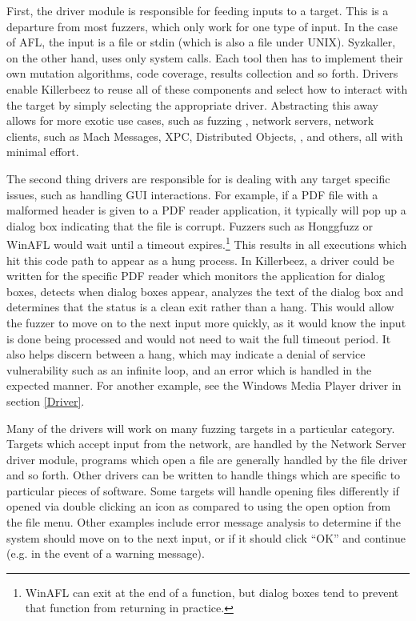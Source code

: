 First, the driver module is responsible for feeding inputs to a target.  This
is a departure from most fuzzers, which only work for one type of input.  In
the case of AFL, the input is a file or stdin (which is also a file under
UNIX).  Syzkaller\cite{syzkaller}, on the other hand, uses only system calls.
Each tool then has to implement their own mutation algorithms, code coverage,
results collection and so forth. Drivers enable Killerbeez to reuse all of
these components and select how to interact with the target by simply selecting
the appropriate driver.  Abstracting this away allows for more exotic use
cases, such as fuzzing \IOCTLs{}, network servers, network clients, \IPC{} such as
Mach Messages, XPC, Distributed Objects, \COM{}, and others, all with minimal
effort.

The second thing drivers are responsible for is dealing with any target
specific issues, such as handling GUI interactions.  For example, if a PDF file
with a malformed header is given to a PDF reader application, it typically will
pop up a dialog box indicating that the file is corrupt. Fuzzers such as
Honggfuzz or WinAFL would wait until a timeout expires.\footnote{WinAFL can
exit at the end of a function, but dialog boxes tend to prevent that function
from returning in practice.} This results in all executions which hit this code
path to appear as a hung process.  In Killerbeez, a driver could be written for
the specific PDF reader which monitors the application for dialog boxes,
detects when dialog boxes appear, analyzes the text of the dialog box and
determines that the status is a clean exit rather than a hang.  This would allow
the fuzzer to move on to the next input more quickly, as it would know the
input is done being processed and would not need to wait the full timeout
period.  It also helps discern between a hang, which may indicate a denial of
service vulnerability such as an infinite loop, and an error which is handled
in the expected manner. For another example, see the Windows Media Player
driver in section \ref{Driver}.

Many of the drivers will work on many fuzzing targets in a particular category.
Targets which accept input from the network, are handled by the Network Server
driver module, programs which open a file are generally handled by the file
driver and so forth.  Other drivers can be written to handle things which are
specific to particular pieces of software.  Some targets will handle opening files
differently if opened via double clicking an icon as compared to using the open
option from the file menu. Other examples include error message analysis to
determine if the system should move on to the next input, or if it should click
``OK'' and continue (e.g. in the event of a warning message).

